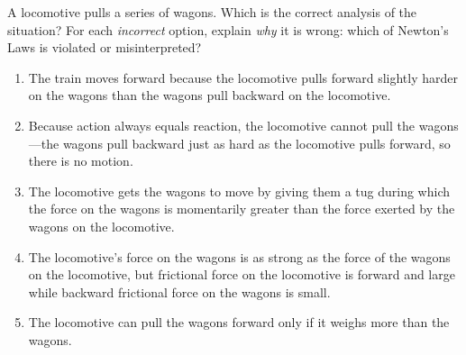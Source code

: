 \documentclass[11pt, letterpaper, openany]{book}
\newenvironment{exercise}[1][Exercise]{%
  \tcolorbox[blanker, breakable, left=1em,
    before skip=1em, after skip=1em,
    borderline west={3pt}{0pt}{PhysNavy},
    colback=PhysCream,
    before upper={\textcolor{PhysNavy}{\sffamily\bfseries #1:}\space}
  ]%
}{%
  \endtcolorbox%
}
\begin{document}
\begin{exercise}[Exercise 8]
\begin{center}
\end{center}

A locomotive pulls a series of wagons. Which is the correct analysis of the situation? For each \textit{incorrect} option, explain \textit{why} it is wrong: which of Newton's Laws is violated or misinterpreted?

\begin{enumerate}[label=\Alph*.]
    \item The train moves forward because the locomotive pulls forward slightly harder on the wagons than the wagons pull backward on the locomotive.
    \item Because action always equals reaction, the locomotive cannot pull the wagons---the wagons pull backward just as hard as the locomotive pulls forward, so there is no motion.
    \item The locomotive gets the wagons to move by giving them a tug during which the force on the wagons is momentarily greater than the force exerted by the wagons on the locomotive.
    \item The locomotive's force on the wagons is as strong as the force of the wagons on the locomotive, but frictional force on the locomotive is forward and large while backward frictional force on the wagons is small.
    \item The locomotive can pull the wagons forward only if it weighs more than the wagons.
\end{enumerate}
\end{exercise}
\end{document}
